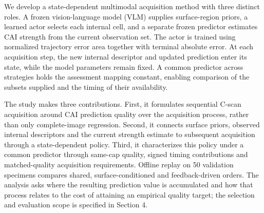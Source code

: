 We develop a state-dependent multimodal acquisition method with three distinct roles. A frozen vision-language model (VLM) supplies surface-region priors, a learned actor selects each internal cell, and a separate frozen predictor estimates CAI strength from the current observation set. The actor is trained using normalized trajectory error area together with terminal absolute error. At each acquisition step, the new internal descriptor and updated prediction enter its state, while the model parameters remain fixed. A common predictor across strategies holds the assessment mapping constant, enabling comparison of the subsets supplied and the timing of their availability.

The study makes three contributions. First, it formulates sequential C-scan acquisition around CAI prediction quality over the acquisition process, rather than only complete-image regression. Second, it connects surface priors, observed internal descriptors and the current strength estimate to subsequent acquisition through a state-dependent policy. Third, it characterizes this policy under a common predictor through same-cap quality, signed timing contributions and matched-quality acquisition requirements. Offline replay on 50 validation specimens compares shared, surface-conditioned and feedback-driven orders. The analysis asks where the resulting prediction value is accumulated and how that process relates to the cost of attaining an empirical quality target; the selection and evaluation scope is specified in Section 4.
